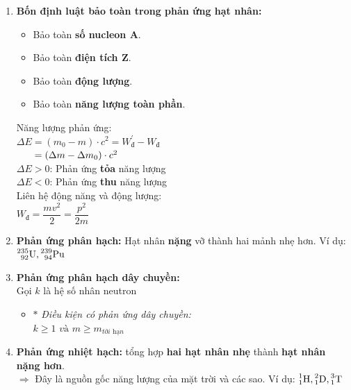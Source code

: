 \documentclass[a4paper,12pt,titlepage,twocolumn]{article}
\newenvironment{myitemize} 
{ \begin{itemize}[leftmargin=*,label=-]  %
		\setlength{\itemsep}{0pt}
		\setlength{\parskip}{0pt}
		\setlength{\parsep}{0pt}     }
{ \end{itemize}                  }
\newenvironment{myenumerate}
{ \begin{enumerate}[label=\textbf{\arabic*}.]
\setlist{nolistsep} %
\setlength{\itemsep}{0pt}
\setlength{\parskip}{0pt}
\setlength{\parsep}{0pt}	}
{ \end{enumerate}}
\begin{document}
\begin{myenumerate}
	$T$ và $\lambda$ \textbf{không phụ thuộc} yếu tố bên ngoài, chỉ phụ thuộc \textbf{bản chất} của chất phóng xạ
	\item \textbf{Bốn định luật bảo toàn trong phản ứng hạt nhân:}
	\begin{myitemize}
		\item Bảo toàn \textbf{số nucleon A}.
		\item Bảo toàn \textbf{điện tích Z}.
		\item Bảo toàn \textbf{động lượng}.
		\item Bảo toàn \textbf{năng lượng toàn phần}.
	\end{myitemize}
	Năng lượng phản ứng: \\
	$\Delta E = (m_0-m) \cdot c^2 = W^{\prime}_{\textit{đ}} -  W_{\textit{đ}}$ \\ 
	$\text{\quad \phantom{a}} =(\Delta m - \Delta m_0) \cdot c^2$ \\
	$\Delta E>0$: Phản ứng \textbf{tỏa} năng lượng \\
	$\Delta E<0$: Phản ứng \textbf{thu} năng lượng \\
	Liên hệ động năng và động lượng: \\ 
	$W_{\textit{đ}} = \dfrac{mv^2}{2} = \dfrac{p^2}{2m}$
	\item \textbf{Phản ứng phân hạch:} Hạt nhân \textbf{nặng} vỡ thành {hai mảnh nhẹ hơn}. 
	Ví dụ: $\prescript{235}{92}{\text{U}}, \prescript{239}{94}{\text{Pu}}$
	\item \textbf{Phản ứng phân hạch dây chuyền:} \\
	Gọi $k$ là hệ số nhân neutron
	\begin{myitemize}
		\item[$\ast$] \textit{Điều kiện có phản ứng dây chuyền:} \\
		$k \geqslant 1 \textit{ và } m \geqslant m_{\textit{tới hạn}}$
	\end{myitemize}
	\item \textbf{Phản ứng nhiệt hạch:} tổng hợp \textbf{hai hạt nhân nhẹ} thành \textbf{hạt nhân nặng hơn}. \\
	$\Rightarrow$ Đây là nguồn gốc năng lượng của mặt trời và các sao. Ví dụ: $\prescript{1}{1}{\text{H}}, \prescript{2}{1}{\text{D}},\prescript{3}{1}{\text{T}}$
\end{myenumerate}
\end{document}
